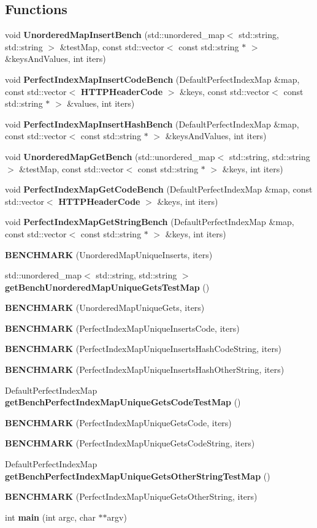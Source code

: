 \subsection*{Functions}
\begin{DoxyCompactItemize}
\item 
void {\bf Unordered\+Map\+Insert\+Bench} (std\+::unordered\+\_\+map$<$ std\+::string, std\+::string $>$ \&test\+Map, const std\+::vector$<$ const std\+::string $\ast$ $>$ \&keys\+And\+Values, int iters)
\item 
void {\bf Perfect\+Index\+Map\+Insert\+Code\+Bench} (Default\+Perfect\+Index\+Map \&map, const std\+::vector$<$ {\bf H\+T\+T\+P\+Header\+Code} $>$ \&keys, const std\+::vector$<$ const std\+::string $\ast$ $>$ \&values, int iters)
\item 
void {\bf Perfect\+Index\+Map\+Insert\+Hash\+Bench} (Default\+Perfect\+Index\+Map \&map, const std\+::vector$<$ const std\+::string $\ast$ $>$ \&keys\+And\+Values, int iters)
\item 
void {\bf Unordered\+Map\+Get\+Bench} (std\+::unordered\+\_\+map$<$ std\+::string, std\+::string $>$ \&test\+Map, const std\+::vector$<$ const std\+::string $\ast$ $>$ \&keys, int iters)
\item 
void {\bf Perfect\+Index\+Map\+Get\+Code\+Bench} (Default\+Perfect\+Index\+Map \&map, const std\+::vector$<$ {\bf H\+T\+T\+P\+Header\+Code} $>$ \&keys, int iters)
\item 
void {\bf Perfect\+Index\+Map\+Get\+String\+Bench} (Default\+Perfect\+Index\+Map \&map, const std\+::vector$<$ const std\+::string $\ast$ $>$ \&keys, int iters)
\item 
{\bf B\+E\+N\+C\+H\+M\+A\+RK} (Unordered\+Map\+Unique\+Inserts, iters)
\item 
std\+::unordered\+\_\+map$<$ std\+::string, std\+::string $>$ {\bf get\+Bench\+Unordered\+Map\+Unique\+Gets\+Test\+Map} ()
\item 
{\bf B\+E\+N\+C\+H\+M\+A\+RK} (Unordered\+Map\+Unique\+Gets, iters)
\item 
{\bf B\+E\+N\+C\+H\+M\+A\+RK} (Perfect\+Index\+Map\+Unique\+Inserts\+Code, iters)
\item 
{\bf B\+E\+N\+C\+H\+M\+A\+RK} (Perfect\+Index\+Map\+Unique\+Inserts\+Hash\+Code\+String, iters)
\item 
{\bf B\+E\+N\+C\+H\+M\+A\+RK} (Perfect\+Index\+Map\+Unique\+Inserts\+Hash\+Other\+String, iters)
\item 
Default\+Perfect\+Index\+Map {\bf get\+Bench\+Perfect\+Index\+Map\+Unique\+Gets\+Code\+Test\+Map} ()
\item 
{\bf B\+E\+N\+C\+H\+M\+A\+RK} (Perfect\+Index\+Map\+Unique\+Gets\+Code, iters)
\item 
{\bf B\+E\+N\+C\+H\+M\+A\+RK} (Perfect\+Index\+Map\+Unique\+Gets\+Code\+String, iters)
\item 
Default\+Perfect\+Index\+Map {\bf get\+Bench\+Perfect\+Index\+Map\+Unique\+Gets\+Other\+String\+Test\+Map} ()
\item 
{\bf B\+E\+N\+C\+H\+M\+A\+RK} (Perfect\+Index\+Map\+Unique\+Gets\+Other\+String, iters)
\item 
int {\bf main} (int argc, char $\ast$$\ast$argv)
\end{DoxyCompactItemize}
